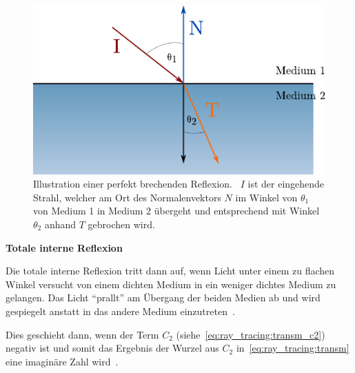 \begin{figure}[H]\label{fig:ray_tracing_specular_transmission}
    \centering
    \includegraphics{img/perfect_specular_tranmission.pdf}
    \caption{Illustration einer perfekt brechenden
        Reflexion.~\protect\footnotemark{}
        $I$ ist der eingehende Strahl, welcher am Ort des
        Normalenvektors $N$ im Winkel von $\theta_{1}$ von Medium 1 in
        Medium 2 übergeht und entsprechend mit Winkel $\theta_{2}$
        anhand $T$ gebrochen wird.}
\end{figure}

\textbf{Totale interne Reflexion}

Die totale interne Reflexion tritt dann auf, wenn Licht unter einem zu
flachen Winkel versucht von einem dichten Medium in ein weniger dichtes
Medium zu gelangen. Das Licht ``prallt'' am Übergang der beiden Medien ab
und wird gespiegelt anstatt in das andere Medium
einzutreten~\parencite[S. 136 bis 137]{glassner_introduction_1989}.

Dies geschieht dann, wenn der Term $C_{2}$
(siehe~\autoref{eq:ray_tracing:transm_c2}) negativ ist und somit das
Ergebnis der Wurzel aus $C_{2}$ in~\ref{eq:ray_tracing:transm} eine
imaginäre Zahl wird~\parencite[S. 137 bis 138]{glassner_introduction_1989}.

